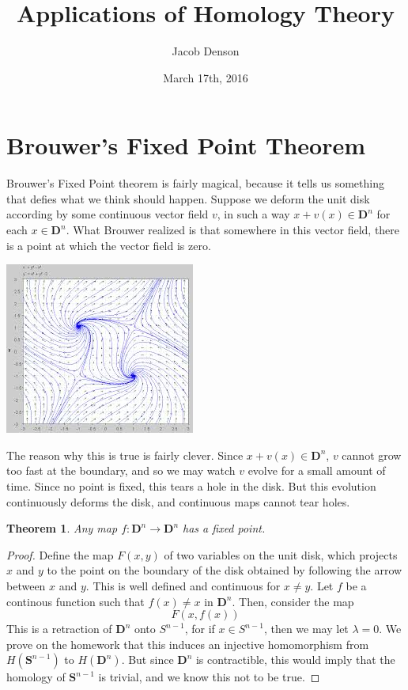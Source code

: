 \documentclass{article}
\title{Applications of Homology Theory}
\author{Jacob Denson}
\date{March 17th, 2016}
\theoremstyle{plain}
\newtheorem{theorem}{Theorem}
\begin{document}
\maketitle

\section{Brouwer's Fixed Point Theorem}

Brouwer's Fixed Point theorem is fairly magical, because it tells us something that defies what we think should happen. Suppose we deform the unit disk according by some continuous vector field $v$, in such a way $x + v(x) \in \mathbf{D}^n$ for each $x \in \mathbf{D}^n$. What Brouwer realized is that somewhere in this vector field, there is a point at which the vector field is zero.

\begin{center}
\includegraphics[scale=0.4]{vectorField.jpg}
\end{center}


The reason why this is true is fairly clever. Since $x + v(x) \in \mathbf{D}^n$, $v$ cannot grow too fast at the boundary, and so we may watch $v$ evolve for a small amount of time. Since no point is fixed, this tears a hole in the disk. But this evolution continuously deforms the disk, and continuous maps cannot tear holes.

\begin{theorem}
    Any map $f: \mathbf{D}^n \to \mathbf{D}^n$ has a fixed point.
\end{theorem}
\begin{proof}
Define the map $F(x,y)$ of two variables on the unit disk, which projects $x$ and $y$ to the point on the boundary of the disk obtained by following the arrow between $x$ and $y$. This is well defined and continuous for $x \neq y$. Let $f$ be a continous function such that $f(x) \neq x$ in $\mathbf{D}^n$. Then, consider the map
%
\[ F(x,f(x)) \]
%
This is a retraction of $\mathbf{D}^n$ onto $S^{n-1}$, for if $x \in S^{n-1}$, then we may let $\lambda = 0$. We prove on the homework that this induces an injective homomorphism from $H(\mathbf{S}^{n-1})$ to $H(\mathbf{D}^n)$. But since $\mathbf{D}^n$ is contractible, this would imply that the homology of $\mathbf{S}^{n-1}$ is trivial, and we know this not to be true.
\end{proof}
\end{document}
